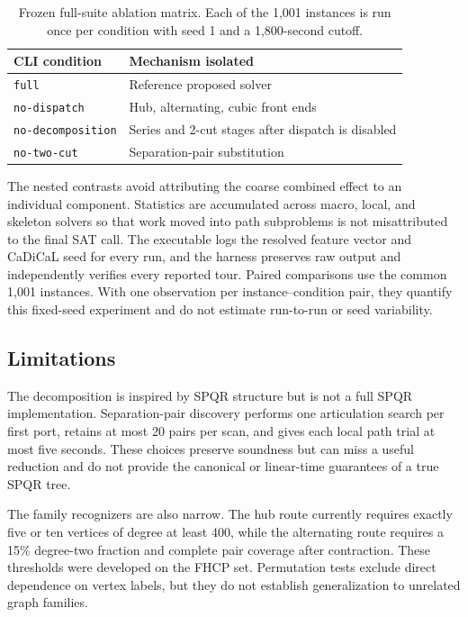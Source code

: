\documentclass[sigconf,anonymous]{aamas}
\begin{document}
\begin{table}[t]
  \caption{Frozen full-suite ablation matrix. Each of the 1,001 instances
  is run once per condition with seed 1 and a 1,800-second cutoff.}
  \label{tab:ablation}
  \centering\small
  \begin{tabular}{@{}p{}p{}@{}}\toprule
    CLI condition & Mechanism isolated\\ \midrule
    \texttt{full} & Reference proposed solver\\
    \texttt{no-dispatch} & Hub, alternating, cubic front ends\\
    \texttt{no-decomposition} & Series and 2-cut stages after dispatch is disabled\\
    \texttt{no-two-cut} & Separation-pair substitution\\
    \bottomrule
  \end{tabular}
\end{table}

The nested contrasts avoid attributing the coarse combined effect to an
individual component. Statistics
are accumulated across macro, local, and
skeleton solvers so that work moved into path subproblems is not
misattributed to the final SAT call. The executable logs the resolved
feature vector and CaDiCaL seed for every run, and the harness preserves
raw output and independently verifies every reported tour. Paired
comparisons use the common 1,001 instances. With one observation per
instance--condition pair, they quantify this fixed-seed experiment and
do not estimate run-to-run or seed variability.

\subsection{Limitations}
\label{sec:limitations}

The decomposition is inspired by SPQR structure but is not a full SPQR
implementation. Separation-pair discovery performs one articulation
search per first port, retains at most 20 pairs per scan, and gives each
local path trial at most five seconds. These choices preserve soundness
but can miss a useful reduction and do not provide the canonical or
linear-time guarantees of a true SPQR tree.

The family recognizers are also narrow. The hub route currently requires
exactly five or ten vertices of degree at least 400, while the
alternating route requires a 15\% degree-two fraction and complete pair
coverage after contraction. These thresholds were developed on the FHCP
set. Permutation tests exclude direct dependence on vertex labels, but
they do not establish generalization to unrelated graph families.
\end{document}
